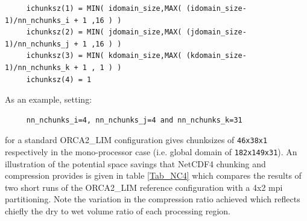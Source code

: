 \vspace{-20pt}
\begin{alltt}  {{\scriptsize 
\begin{verbatim}
     ichunksz(1) = MIN( idomain_size,MAX( (idomain_size-1)/nn_nchunks_i + 1 ,16 ) )
     ichunksz(2) = MIN( jdomain_size,MAX( (jdomain_size-1)/nn_nchunks_j + 1 ,16 ) )
     ichunksz(3) = MIN( kdomain_size,MAX( (kdomain_size-1)/nn_nchunks_k + 1 , 1 ) )
     ichunksz(4) = 1
\end{verbatim}
}}\end{alltt} 

\noindent As an example, setting:
\vspace{-20pt}
\begin{alltt}  {{\scriptsize
\begin{verbatim}
     nn_nchunks_i=4, nn_nchunks_j=4 and nn_nchunks_k=31
\end{verbatim}
}}\end{alltt} \vspace{-10pt}

\noindent for a standard ORCA2\_LIM configuration gives chunksizes of {\small\tt 46x38x1}
respectively in the mono-processor case (i.e. global domain of {\small\tt 182x149x31}).
An illustration of the potential space savings that NetCDF4 chunking and compression
provides is given in table \ref{Tab_NC4} which compares the results of two short
runs of the ORCA2\_LIM reference configuration with a 4x2 mpi partitioning. Note
the variation in the compression ratio achieved which reflects chiefly the dry to wet 
volume ratio of each processing region.

